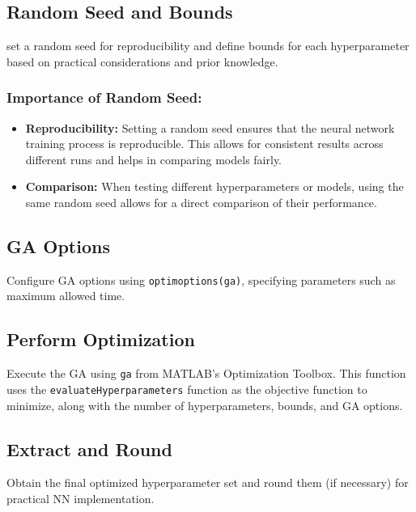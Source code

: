 \documentclass[
]{agujournal2019}
\providecommand{\tightlist}{%
  \setlength{\itemsep}{0pt}\setlength{\parskip}{0pt}}\usepackage{longtable,booktabs,array}
\begin{document}
\subsection{Random Seed and Bounds}\label{random-seed-and-bounds}

set a random seed for reproducibility and define bounds for each
hyperparameter based on practical considerations and prior knowledge.

\subsubsection{Importance of Random
Seed:}\label{importance-of-random-seed}

\begin{itemize}
\tightlist
\item
  \textbf{Reproducibility:} Setting a random seed ensures that the
  neural network training process is reproducible. This allows for
  consistent results across different runs and helps in comparing models
  fairly.
\item
  \textbf{Comparison:} When testing different hyperparameters or models,
  using the same random seed allows for a direct comparison of their
  performance.
\end{itemize}

\subsection{GA Options}\label{ga-options}

Configure GA options using
\texttt{optimoptions(\textquotesingle{}ga\textquotesingle{})},
specifying parameters such as maximum allowed time.

\subsection{Perform Optimization}\label{perform-optimization}

Execute the GA using \texttt{ga} from MATLAB's Optimization Toolbox.
This function uses the \texttt{evaluateHyperparameters} function as the
objective function to minimize, along with the number of
hyperparameters, bounds, and GA options.

\subsection{Extract and Round}\label{extract-and-round}

Obtain the final optimized hyperparameter set and round them (if
necessary) for practical NN implementation.
\end{document}
